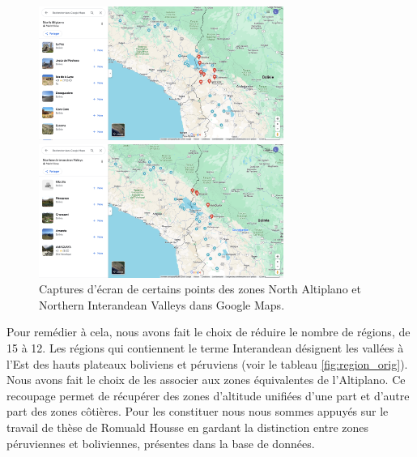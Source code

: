    \begin{figure}[!h]
    \begin{minipage}[c]{.5\linewidth}
            \begin{center}
                \includegraphics[width=8cm]{../images/GM_NorthAltiplano.png}
            \end{center}
    \end{minipage}
        \begin{minipage}[c]{.5\linewidth}
        \begin{center}
        		\includegraphics[width=8cm]{../images/GM_NorthernInterandeanValleys.png}
	\end{center}
    \end{minipage}
    	\caption{Captures d'écran de certains points des zones \og North Altiplano \fg \:et \og Northern Interandean Valleys \fg dans Google Maps.}
	\label{fig:GM}   
\end{figure}

Pour remédier à cela, nous avons fait le choix de réduire le nombre de régions, de 15 à 12. Les régions qui contiennent le terme \og Interandean \fg \:désignent les vallées à l'Est des hauts plateaux boliviens et péruviens (voir le tableau \ref{fig:region_orig}). Nous avons fait le choix de les associer aux zones équivalentes de l'Altiplano. Ce recoupage permet de récupérer des zones d'altitude unifiées d'une part et d'autre part des zones côtières. Pour les constituer nous nous sommes appuyés sur le travail de thèse de Romuald Housse en gardant la distinction entre zones péruviennes et boliviennes, présentes dans la base de données. 
 
